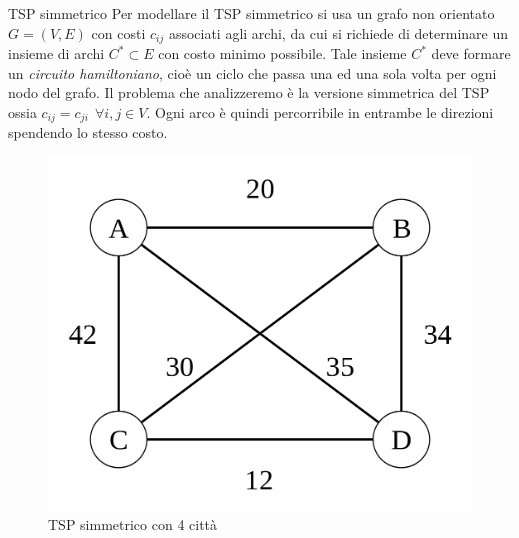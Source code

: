 \documentclass[10pt]{beamer}
\begin{document}
\begin{frame}{TSP simmetrico}
    Per modellare il TSP simmetrico si usa un grafo non orientato $G=(V,E)$ con costi $c_{ij}$ associati agli archi, da cui si richiede di determinare un insieme di archi $C^* \subset E$ con costo minimo possibile. Tale insieme $C^*$ deve formare un \textit{circuito hamiltoniano}, cioè un ciclo che passa una ed una sola volta per ogni nodo del grafo. Il problema che analizzeremo è la versione simmetrica del TSP ossia $c_{ij} = c_{ji} \:\: \forall i,j \in V$. Ogni arco è quindi percorribile in entrambe le direzioni spendendo lo stesso costo.
    \begin{figure}
        \centering
        \includegraphics[scale=0.11]{files/SimmetricTSP.png}
        \caption{TSP simmetrico con 4 città}
    \end{figure}
\end{frame}
\end{document}
